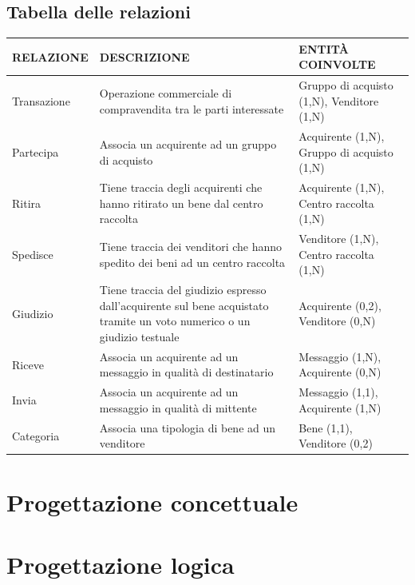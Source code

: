 \documentclass[a4paper, 10pt]{report}
\begin{document}
\section{Tabella delle relazioni}
\newpage
\begin{longtable}{|l|p{4cm}|l|}
\hline
\textbf{RELAZIONE}&\textbf{DESCRIZIONE}&\textbf{ENTIT\`A COINVOLTE}\\
\hline
Transazione & Operazione commerciale di compravendita tra le parti interessate & Gruppo di acquisto (1,N), Venditore (1,N)  \\
\hline
Partecipa & Associa un acquirente ad un gruppo di acquisto & Acquirente (1,N), Gruppo di acquisto (1,N) \\
\hline
Ritira & Tiene traccia degli acquirenti che hanno ritirato un bene dal centro raccolta & Acquirente (1,N), Centro raccolta (1,N) \\
\hline
Spedisce & Tiene traccia dei venditori che hanno spedito dei beni ad un centro raccolta & Venditore (1,N), Centro raccolta (1,N) \\
\hline
Giudizio & Tiene traccia del giudizio espresso dall'acquirente sul bene acquistato tramite un voto numerico o un giudizio testuale & Acquirente (0,2), Venditore (0,N) \\
\hline
Riceve & Associa un acquirente ad un messaggio in qualit\`a di destinatario & Messaggio (1,N), Acquirente (0,N) \\
\hline
Invia & Associa un acquirente ad un messaggio in qualit\`a di mittente & Messaggio (1,1), Acquirente (1,N) \\
\hline
Categoria & Associa una tipologia di bene ad un venditore & Bene (1,1), Venditore (0,2) \\
\hline
\end{longtable}

\chapter{Progettazione concettuale}

\chapter{Progettazione logica}
\end{document}
